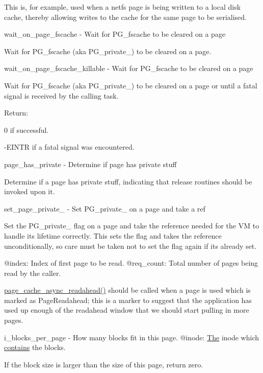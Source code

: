 This is, for example, used when a netfs page is being written to a local disk cache, thereby allowing writes to the cache for the same page to be serialised.

wait\+\_\+on\+\_\+page\+\_\+fscache -\/ Wait for P\+G\+\_\+fscache to be cleared on a page

Wait for P\+G\+\_\+fscache (aka P\+G\+\_\+private\+\_) to be cleared on a page.

wait\+\_\+on\+\_\+page\+\_\+fscache\+\_\+killable -\/ Wait for P\+G\+\_\+fscache to be cleared on a page

Wait for P\+G\+\_\+fscache (aka P\+G\+\_\+private\+\_) to be cleared on a page or until a fatal signal is received by the calling task.

Return\+:
\begin{DoxyItemize}
\item 0 if successful.
\item -\/E\+I\+N\+TR if a fatal signal was encountered.
\end{DoxyItemize}

page\+\_\+has\+\_\+private -\/ Determine if page has private stuff

Determine if a page has private stuff, indicating that release routines should be invoked upon it.

set\+\_\+page\+\_\+private\+\_ -\/ Set P\+G\+\_\+private\+\_ on a page and take a ref

Set the P\+G\+\_\+private\+\_ flag on a page and take the reference needed for the VM to handle its lifetime correctly. This sets the flag and takes the reference unconditionally, so care must be taken not to set the flag again if it\textquotesingle{}s already set.

@index\+: Index of first page to be read. @req\+\_\+count\+: Total number of pages being read by the caller.

\mbox{\hyperlink{linux_2pagemap_8h_ac03057f36147134faa0fdd8ad9d4f7eb}{page\+\_\+cache\+\_\+async\+\_\+readahead()}} should be called when a page is used which is marked as Page\+Readahead; this is a marker to suggest that the application has used up enough of the readahead window that we should start pulling in more pages.

i\+\_\+blocks\+\_\+per\+\_\+page -\/ How many blocks fit in this page. @inode\+: \mbox{\hyperlink{classThe}{The}} inode which \mbox{\hyperlink{protocolcontains-p}{contains}} the blocks.

If the block size is larger than the size of this page, return zero.

